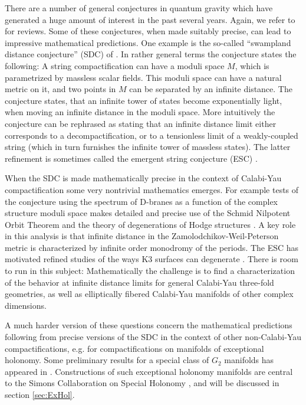 \documentclass[12pt]{article}
\begin{document}
There are a number of general conjectures in quantum gravity 
which have generated a huge amount of interest in the past 
several years. Again, we refer to \cite{Brennan:2017rbf, Palti:2019pca, vanBeest:2021lhn, Harlow:2022gzl} for reviews. Some of these conjectures, when 
made suitably precise, can lead to impressive mathematical predictions. 
One example is the so-called ``swampland distance conjecture'' (SDC)
of \cite{Ooguri:2006in}. In rather general terms the conjecture states the following: A string compactification can have a moduli space $M$, which is parametrized by massless scalar fields. This moduli space can have a natural metric on it, and two points in $M$ can be separated by an infinite distance. The conjecture states, that an infinite tower of states become exponentially light, when moving an infinite distance in the moduli space. 
More intuitively the conjecture can be rephrased as stating that an infinite distance limit either corresponds to a decompactification, or to a tensionless limit of a weakly-coupled string (which in turn furnishes the infinite tower of massless states). The latter refinement is sometimes 
called the emergent string conjecture (ESC) \cite{Lee:2019wij}. 

When the SDC is made mathematically precise in the context of Calabi-Yau compactification some very nontrivial mathematics emerges.  
For example tests of the conjecture using the spectrum of D-branes 
as a function of the complex structure moduli space makes detailed 
and precise use of the Schmid Nilpotent Orbit Theorem and the theory 
of degenerations of Hodge structures
\cite{Eguchi:2005eh,Grimm:2018ohb,Grimm:2018cpv,Joshi:2019nzi,Bastian:2021eom}. 
A key role in this analysis is that infinite 
distance in the Zamolodchikov-Weil-Peterson metric is characterized 
by infinite order monodromy of the periods. The ESC  has motivated 
refined studies of the ways K3 surfaces can degenerate \cite{Lee:2021qkx}. 
There is room to run in this subject: 
Mathematically the challenge is to find a characterization of the behavior at infinite distance limits for general Calabi-Yau three-fold  geometries, as well as elliptically fibered Calabi-Yau manifolds of other complex  
dimensions. 

A much harder version of these questions concern the mathematical predictions following from precise versions of the SDC in the context of other non-Calabi-Yau compactifications, e.g. for compactifications on manifolds of exceptional holonomy.   Some preliminary results for a special class of $G_2$ manifolds has appeared in \cite{Xu:2020nlh}. 
Constructions of such exceptional holonomy manifolds are central to the Simons Collaboration on Special Holonomy \cite{SimonsCollab:SpecialHolonomy}, and will be discussed in section \ref{sec:ExHol}. 
\end{document}
